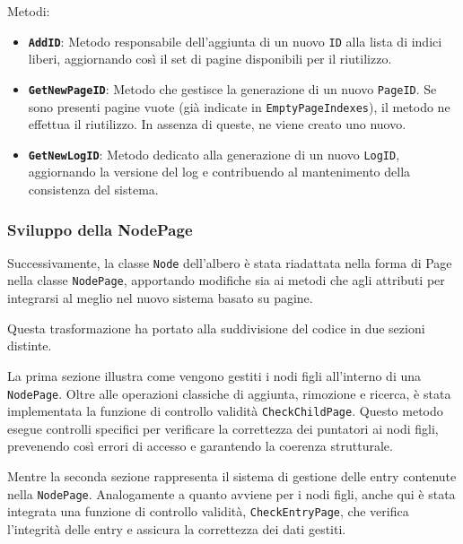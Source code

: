 \documentclass[12pt,a4paper,openright,twoside]{book}
\begin{document}
                Metodi:
                \begin{itemize}
                    \item \textbf{\texttt{AddID}}: Metodo responsabile dell’aggiunta di un nuovo \texttt{ID} alla lista di indici liberi, aggiornando così il set di pagine disponibili per il riutilizzo.
                    \item \textbf{\texttt{GetNewPageID}}: Metodo che gestisce la generazione di un nuovo \texttt{PageID}.
                    Se sono presenti pagine vuote (già indicate in \texttt{EmptyPageIndexes}), il metodo ne effettua il riutilizzo.
                    In assenza di queste, ne viene creato uno nuovo.
                    \item \textbf{\texttt{GetNewLogID}}: Metodo dedicato alla generazione di un nuovo \texttt{LogID}, aggiornando la versione del log e contribuendo al mantenimento della consistenza del sistema.
                \end{itemize}

            \subsubsection{Sviluppo della NodePage}

                Successivamente, la classe \texttt{Node} dell'albero è stata riadattata nella forma di Page nella classe \texttt{NodePage}, apportando modifiche sia ai metodi che agli attributi per integrarsi al meglio nel nuovo sistema basato su pagine.

                Questa trasformazione ha portato alla suddivisione del codice in due sezioni distinte.

                La prima sezione illustra come vengono gestiti i nodi figli all'interno di una \texttt{NodePage}. Oltre alle operazioni classiche di aggiunta, rimozione e ricerca, è stata implementata la funzione di controllo validità \texttt{CheckChildPage}. Questo metodo esegue controlli specifici per verificare la correttezza dei puntatori ai nodi figli, prevenendo così errori di accesso e garantendo la coerenza strutturale.

                Mentre la seconda sezione rappresenta il sistema di gestione delle entry contenute nella \texttt{NodePage}. Analogamente a quanto avviene per i nodi figli, anche qui è stata integrata una funzione di controllo validità, \texttt{CheckEntryPage}, che verifica l'integrità delle entry e assicura la correttezza dei dati gestiti.
\end{document}
